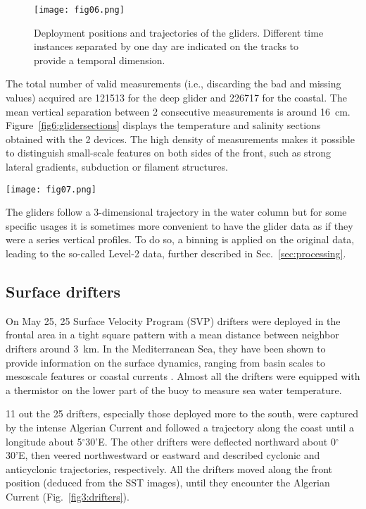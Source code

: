 \documentclass[essd,manuscript]{copernicus}
\begin{document}
\begin{figure}[t]
\texttt{[image: fig06.png]}
\caption{Deployment positions and trajectories of the gliders. Different time instances separated by one day are indicated on the tracks to provide a temporal dimension.\label{fig6:glidertracks}}
\end{figure}

The total number of valid measurements (i.e., discarding the bad and missing values) acquired are 121513 for the deep glider and 226717 for the coastal. The mean vertical separation between 2 consecutive measurements is around 16~cm. Figure~\ref{fig6:glidersections} displays the temperature and salinity sections obtained with the 2 devices. The high density of measurements makes it possible to distinguish small-scale features on both sides of the front, such as strong lateral gradients, subduction or filament structures.  

\begin{figure*}[t]
\texttt{[image: fig07.png]}
\caption{Temperature (top) and salinity measured by the two gliders. The approximative front position at the surface is shown as a dashed, grey line.\label{fig6:glidersections}}
\end{figure*}

The gliders follow a 3-dimensional trajectory in the water column but for some specific usages it is sometimes more convenient to have the glider data as if they were a series vertical profiles. To do so, a binning is applied on the original data, leading to the so-called Level-2 data, further described in Sec.~\ref{sec:processing}.


\subsection{Surface drifters}

On May 25, 25 Surface Velocity Program (SVP) drifters were deployed in the frontal area in a tight square pattern with a mean distance between neighbor drifters around 3~km. In the Mediterranean Sea, they have been shown to provide information on the surface dynamics, ranging from basin scales to mesoscale features or coastal currents \citep{POULAIN13}. Almost all the drifters were equipped with a thermistor on the lower part of the buoy to measure sea water temperature. 

11 out the 25 drifters, especially those deployed more to the south, were captured by the intense Algerian Current and followed a trajectory along the coast until a longitude about 5$^{\circ}$30'E. The other drifters were deflected northward about 0$^{\circ}$30'E, then veered northwestward or eastward 
and described cyclonic and anticyclonic trajectories, respectively. All the drifters moved along the front position (deduced from the SST images), until they encounter the Algerian Current (Fig.~\ref{fig3:drifters}). 
\end{document}
